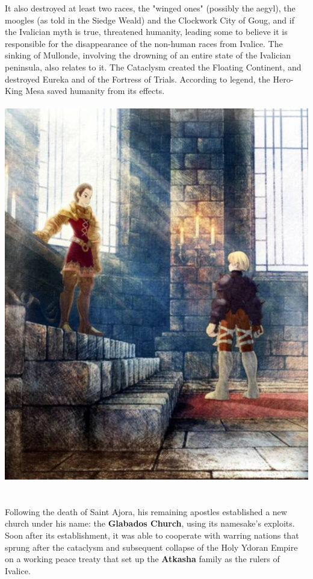 It also destroyed at least two races, the "winged ones" (possibly the aegyl), the moogles (as told in the Siedge Weald) and the Clockwork City of Goug, and if the Ivalician myth is true, threatened humanity, leading some to believe it is responsible for the disappearance of the non-human races from Ivalice. 
The sinking of Mullonde, involving the drowning of an entire state of the Ivalician peninsula, also relates to it. 
The Cataclysm created the Floating Continent, and destroyed Eureka and of the Fortress of Trials. 
According to legend, the Hero-King Mesa saved humanity from its effects.
%
\\\\
\includegraphics[width=\columnwidth]{./art/images/delita.jpg}
\\\\
%
\\
Following the death of Saint Ajora, his remaining apostles established a new church under his name: the \textbf{Glabados Church}, using its namesake's exploits.
Soon after its establishment, it was able to cooperate with warring nations that sprung after the cataclysm and subsequent collapse of the Holy Ydoran Empire on a working peace treaty that set up the \textbf{Atkasha} family as the rulers of Ivalice. 
